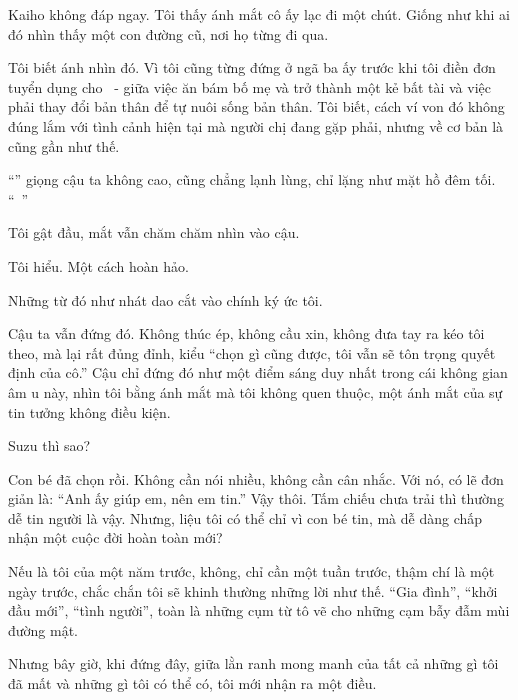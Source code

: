 \documentclass[../main.tex]{subfiles}
\begin{document}
Kaiho không đáp ngay. Tôi thấy ánh mắt cô ấy lạc đi một chút. Giống như khi ai đó nhìn thấy một con đường cũ, nơi họ từng đi qua.

Tôi biết ánh nhìn đó. Vì tôi cũng từng đứng ở ngã ba ấy trước khi tôi điền đơn tuyển dụng cho \hll\ - giữa việc ăn bám bố mẹ và trở thành một kẻ bất tài và việc phải thay đổi bản thân để tự nuôi sống bản thân. Tôi biết, cách ví von đó không đúng lắm với tình cảnh hiện tại mà người chị đang gặp phải, nhưng về cơ bản là cũng gần như thế.


``'' giọng cậu ta không cao, cũng chẳng lạnh lùng, chỉ lặng như mặt hồ đêm tối. ``\ ''

Tôi gật đầu, mắt vẫn chăm chăm nhìn vào cậu.

Tôi hiểu. Một cách hoàn hảo.

Những từ đó như nhát dao cắt vào chính ký ức tôi.

Cậu ta vẫn đứng đó. Không thúc ép, không cầu xin, không đưa tay ra kéo tôi theo, mà lại rất đủng đỉnh, kiểu ``chọn gì cũng được, tôi vẫn sẽ tôn trọng quyết định của cô.'' Cậu chỉ đứng đó như một điểm sáng duy nhất trong cái không gian âm u này, nhìn tôi bằng ánh mắt mà tôi không quen thuộc, một ánh mắt của sự tin tưởng không điều kiện.

Suzu thì sao?

Con bé đã chọn rồi. Không cần nói nhiều, không cần cân nhắc. Với nó, có lẽ đơn giản là: ``Anh ấy giúp em, nên em tin.'' Vậy thôi. Tấm chiếu chưa trải thì thường dễ tin người là vậy. Nhưng, liệu tôi có thể chỉ vì con bé tin, mà dễ dàng chấp nhận một cuộc đời hoàn toàn mới?

Nếu là tôi của một năm trước, không, chỉ cần một tuần trước, thậm chí là một ngày trước, chắc chắn tôi sẽ khinh thường những lời như thế. ``Gia đình'', ``khởi đầu mới'', ``tình người'', toàn là những cụm từ tô vẽ cho những cạm bẫy đẫm mùi đường mật.

Nhưng bây giờ, khi đứng đây, giữa lằn ranh mong manh của tất cả những gì tôi đã mất và những gì tôi có thể có, tôi mới nhận ra một điều.
\end{document}
